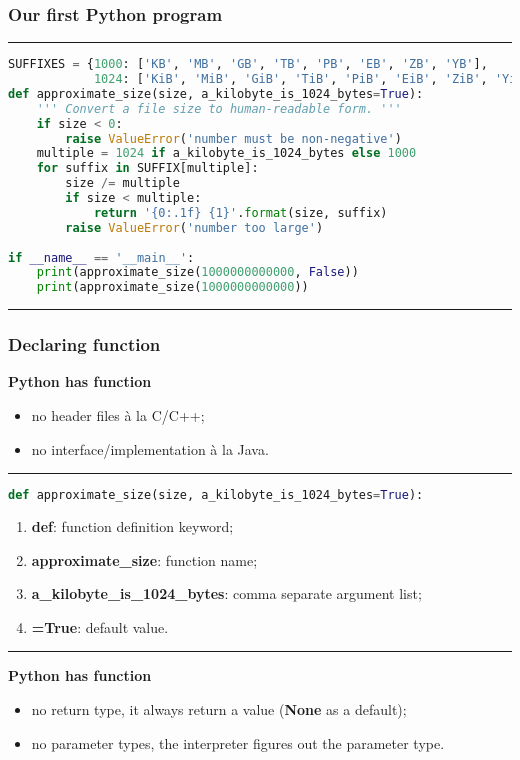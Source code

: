 \subsubsection{Our first Python program}
\hrule
\begin{lstlisting}[language=Python, caption=humanize.py]
SUFFIXES = {1000: ['KB', 'MB', 'GB', 'TB', 'PB', 'EB', 'ZB', 'YB'], 
            1024: ['KiB', 'MiB', 'GiB', 'TiB', 'PiB', 'EiB', 'ZiB', 'YiB']}
def approximate_size(size, a_kilobyte_is_1024_bytes=True):
	''' Convert a file size to human-readable form. '''
	if size < 0:
		raise ValueError('number must be non-negative')
	multiple = 1024 if a_kilobyte_is_1024_bytes else 1000
	for suffix in SUFFIX[multiple]:
		size /= multiple
		if size < multiple:
			return '{0:.1f} {1}'.format(size, suffix)
		raise ValueError('number too large')
				
if __name__ == '__main__':
	print(approximate_size(1000000000000, False))
	print(approximate_size(1000000000000))
\end{lstlisting}
\hrule	

\subsubsection{Declaring function}	
\textbf{Python has function}
\begin{itemize}
	\item no header files à la C/C++;
	\item no interface/implementation à la Java.
\end{itemize}			
\hrule
\begin{lstlisting}[language=Python]
def approximate_size(size, a_kilobyte_is_1024_bytes=True):
\end{lstlisting}	
\begin{enumerate}
	\item \textbf{def}: function definition keyword;
	\item \textbf{approximate\_size}: function name;
	\item \textbf{a\_kilobyte\_is\_1024\_bytes}: comma separate argument list;
	\item \textbf{=True}: default value.
\end{enumerate}
\hrule		
\textbf{Python has function}
\begin{itemize}
	\item no return type, it always return a value (\textbf{None} as a default); 
	\item no parameter types, the interpreter figures out the parameter type.
\end{itemize}	

